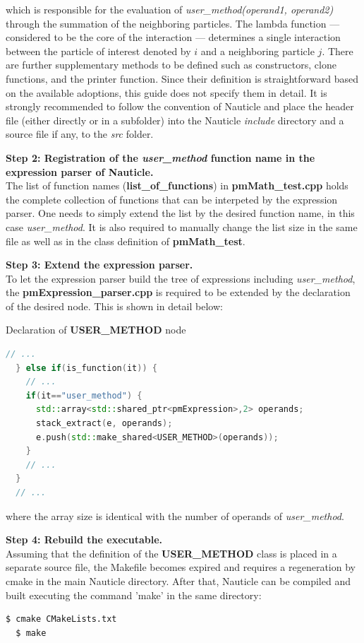 \documentclass[a4paper,12pt,openany]{book}
\theoremstyle{break}
\begin{document}
which is responsible for the evaluation of \textit{user\_method(operand1, operand2)} through the summation of the neighboring particles. The lambda function --- considered to be the core of the interaction --- determines a single interaction between the particle of interest denoted by $i$ and a neighboring particle $j$. There are further supplementary methods to be defined such as constructors, clone functions, and the printer function. Since their definition is straightforward based on the available adoptions, this guide does not specify them in detail. It is strongly recommended to follow the convention of Nauticle and place the header file (either directly or in a subfolder) into the Nauticle \textit{include} directory and a source file if any, to the \textit{src} folder.

\textbf{Step 2: Registration of the \textit{user\_method} function name in the expression parser of Nauticle.} \\
The list of function names (\textbf{list\_of\_functions}) in \textbf{pmMath\_test.cpp} holds the complete collection of functions that can be interpeted by the expression parser. One needs to simply extend the list by the desired function name, in this case \textit{user\_method}. It is also required to manually change the list size in the same file as well as in the class definition of \textbf{pmMath\_test}.

\textbf{Step 3: Extend the expression parser.} \\
To let the expression parser build the tree of expressions including \textit{user\_method}, the \textbf{pmExpression\_parser.cpp} is required to be extended by the declaration of the desired node. This is shown in detail below:
\begin{example}{Declaration of \textbf{USER\_METHOD} node}{}
\lstset{basicstyle=\tiny}
\begin{lstlisting}[language=c++]
  // ...
  } else if(is_function(it)) {
    // ...
    if(it=="user_method") {
      std::array<std::shared_ptr<pmExpression>,2> operands;
      stack_extract(e, operands);
      e.push(std::make_shared<USER_METHOD>(operands));
    }
    // ...
  }
  // ...
\end{lstlisting}
\end{example}
where the array size is identical with the number of operands of \textit{user\_method}.

\textbf{Step 4: Rebuild the executable.} \\
Assuming that the definition of the \textbf{USER\_METHOD} class is placed in a separate source file, the Makefile becomes expired and requires a regeneration by cmake in the main Nauticle directory. After that, Nauticle can be compiled and built executing the command 'make' in the same directory:
\begin{lstlisting}[language=bash]
  $ cmake CMakeLists.txt
  $ make
\end{lstlisting}
\end{document}
